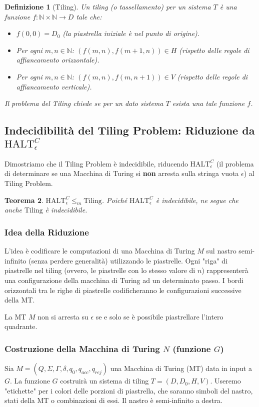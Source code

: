 \documentclass[a4paper, 11pt]{book} %
\newtheorem{theorem}{Teorema}[section]
\newtheorem{definition}[theorem]{Definizione}
\theoremstyle{definition}
\begin{document}
\begin{definition}[Tiling]
Un \emph{tiling} (o tassellamento) per un sistema $T$ è una funzione $f: \mathbb{N} \times \mathbb{N} \to D$ tale che:
\begin{itemize}
    \item $f(0,0) = D_0$ (la piastrella iniziale è nel punto di origine).
    \item Per ogni $m, n \in \mathbb{N}$: $(f(m,n), f(m+1,n)) \in H$ (rispetto delle regole di affiancamento orizzontale).
    \item Per ogni $m, n \in \mathbb{N}$: $(f(m,n), f(m,n+1)) \in V$ (rispetto delle regole di affiancamento verticale).
\end{itemize}
Il problema del Tiling chiede se per un dato sistema $T$ esista una tale funzione $f$.
\end{definition}

\subsection{Indecidibilit\`a del Tiling Problem: Riduzione da $\text{HALT}_\epsilon^C$}
Dimostriamo che il Tiling Problem è indecidibile, riducendo $\text{HALT}_\epsilon^C$ (il problema di determinare se una Macchina di Turing si \textbf{non} arresta sulla stringa vuota $\epsilon$) al Tiling Problem.

\begin{theorem}
$\text{HALT}_\epsilon^C \le_m \text{Tiling}$. Poiché $\text{HALT}_\epsilon^C$ è indecidibile, ne segue che anche $\text{Tiling}$ è indecidibile.
\end{theorem}

\subsubsection{Idea della Riduzione}
L'idea è codificare le computazioni di una Macchina di Turing $M$ sul nastro semi-infinito (senza perdere generalità) utilizzando le piastrelle. Ogni "riga" di piastrelle nel tiling (ovvero, le piastrelle con lo stesso valore di $n$) rappresenterà una configurazione della macchina di Turing ad un determinato passo. I bordi orizzontali tra le righe di piastrelle codificheranno le configurazioni successive della MT.

La MT $M$ non si arresta su $\epsilon$ se e solo se è possibile piastrellare l'intero quadrante.

\subsubsection{Costruzione della Macchina di Turing $N$ (funzione $G$)}
Sia $M = (Q, \Sigma, \Gamma, \delta, q_0, q_{acc}, q_{rej})$ una Macchina di Turing (MT) data in input a $G$. La funzione $G$ costruirà un sistema di tiling $T=(D, D_0, H, V)$.
Useremo "etichette" per i colori delle porzioni di piastrella, che saranno simboli del nastro, stati della MT o combinazioni di essi. Il nastro è semi-infinito a destra.
\end{document}
